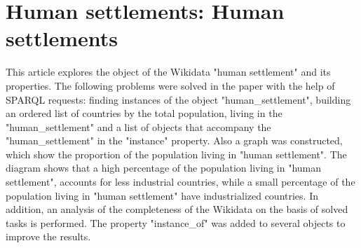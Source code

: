 
\chapter{Human settlements: Human settlements}


This article explores the object of the Wikidata "human settlement" and its properties. The following problems were solved in the paper with the help of SPARQL requests:
finding instances of the object "human\_settlement", building an ordered list of countries by the total population, living in the "human\_settlement" and a list of objects 
that accompany the "human\_settlement" in the "instance" property. Also a graph was constructed, which show the proportion of the population living in "human settlement". 
The diagram shows that a high percentage of the population living in "human settlement", accounts for less industrial countries, while a small percentage of the population 
living in "human settlement" have industrialized countries. In addition, an analysis of the completeness of the Wikidata on the basis of solved tasks is performed. The property 
"instance\_of" was added to several objects to improve the results.

